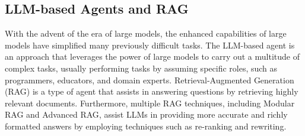 \subsection{LLM-based Agents and RAG}
With the advent of the era of large models, the enhanced capabilities of large models have simplified many previously difficult tasks. The LLM-based agent is an approach that leverages the power of large models to carry out a multitude of complex tasks\cite{llmagentsurvey}, usually performing tasks by assuming specific roles, such as programmers, educators, and domain experts\cite{agents1}. Retrieval-Augmented Generation (RAG) is a type of agent that assists in answering questions by retrieving highly relevant documents\cite{rag}. Furthermore, multiple RAG techniques, including Modular RAG\cite{modrag1,modrag2} and Advanced RAG\cite{advance_rag1,advrag2}, assist LLMs in providing more accurate and richly formatted answers by employing techniques such as re-ranking and rewriting.


